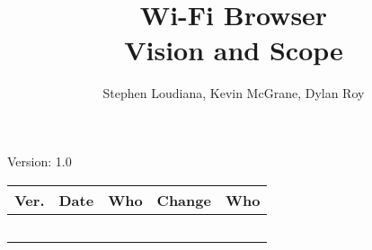 \documentclass[letterpaper,12pt]{article}
\title{Wi-Fi Browser\\Vision and Scope}
\author{Stephen Loudiana, Kevin McGrane, Dylan Roy}
\begin{document}
\maketitle

\begin{center}
  Version: 1.0
\end{center}

\vfill
\begin{tabularx}{\linewidth}{|l|l|l|X|l|}\hline
Ver. & Date & Who & Change & Who \\\hline
     &      &     &        &     \\\hline
     &      &     &        &     \\\hline
     &      &     &        &     \\\hline
     &      &     &        &     \\\hline
     &      &     &        &     \\\hline
\end{tabularx}
\newpage







\end{document}
